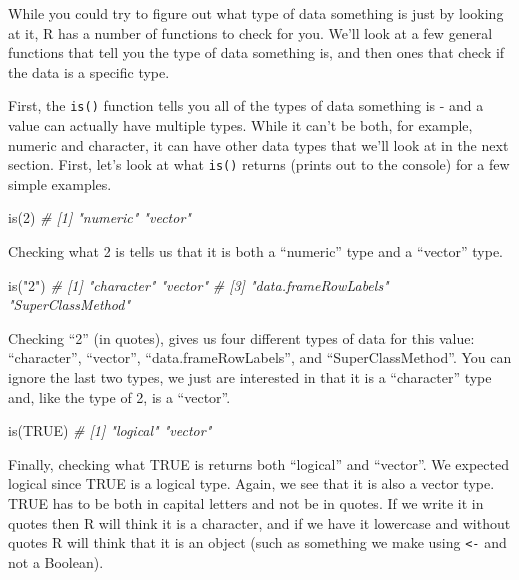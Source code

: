 \documentclass[
]{krantz}
\makeatletter
\newenvironment{Shaded}{\begin{snugshade}}{\end{snugshade}}
\newcommand{\CommentTok}[1]{\textcolor[rgb]{0.37,0.37,0.37}{\textit{#1}}}
\newcommand{\ConstantTok}[1]{\textcolor[rgb]{0,0,0}{#1}}
\newcommand{\DecValTok}[1]{\textcolor[rgb]{0.06,0.06,0.06}{#1}}
\newcommand{\FunctionTok}[1]{\textcolor[rgb]{0,0,0}{#1}}
\newcommand{\NormalTok}[1]{#1}
\newcommand{\StringTok}[1]{\textcolor[rgb]{0.5,0.5,0.5}{#1}}
\newenvironment{kframe}{%
\medskip{}
\setlength{\fboxsep}{.8em}
 \def\at@end@of@kframe{}%
 \ifinner\ifhmode%
  \def\at@end@of@kframe{\end{minipage}}%
  \begin{minipage}{\columnwidth}%
 \fi\fi%
 \def\FrameCommand##1{\hskip\@totalleftmargin \hskip-\fboxsep
 \colorbox{shadecolor}{##1}\hskip-\fboxsep
     \hskip-\linewidth \hskip-\@totalleftmargin \hskip\columnwidth}%
 \MakeFramed {\advance\hsize-\width
   \@totalleftmargin\z@ \linewidth\hsize
   \@setminipage}}%
 {\par\unskip\endMakeFramed%
 \at@end@of@kframe}
\renewenvironment{Shaded}{\begin{kframe}}{\end{kframe}}
\makeatother
\begin{document}
While you could try to figure out what type of data
something is just by looking at it, R has a number of
functions to check for you. We'll look at a few general
functions that tell you the type of data something is, and
then ones that check if the data is a specific type.

First, the \texttt{is()} function tells you all of the types
of data something is - and a value can actually have
multiple types. While it can't be both, for example, numeric
and character, it can have other data types that we'll look
at in the next section. First, let's look at what
\texttt{is()} returns (prints out to the console) for a few
simple examples.

\begin{Shaded}
\begin{Highlighting}[]
\FunctionTok{is}\NormalTok{(}\DecValTok{2}\NormalTok{)}
\CommentTok{\# [1] "numeric" "vector"}
\end{Highlighting}
\end{Shaded}

Checking what 2 is tells us that it is both a ``numeric''
type and a ``vector'' type.

\begin{Shaded}
\begin{Highlighting}[]
\FunctionTok{is}\NormalTok{(}\StringTok{"2"}\NormalTok{)}
\CommentTok{\# [1] "character"           "vector"             }
\CommentTok{\# [3] "data.frameRowLabels" "SuperClassMethod"}
\end{Highlighting}
\end{Shaded}

Checking ``2'' (in quotes), gives us four different types of
data for this value: ``character'', ``vector'',
``data.frameRowLabels'', and ``SuperClassMethod''. You can
ignore the last two types, we just are interested in that it
is a ``character'' type and, like the type of 2, is a
``vector''.

\begin{Shaded}
\begin{Highlighting}[]
\FunctionTok{is}\NormalTok{(}\ConstantTok{TRUE}\NormalTok{)}
\CommentTok{\# [1] "logical" "vector"}
\end{Highlighting}
\end{Shaded}

Finally, checking what TRUE is returns both ``logical'' and
``vector''. We expected logical since TRUE is a logical
type. Again, we see that it is also a vector type. TRUE has
to be both in capital letters and not be in quotes. If we
write it in quotes then R will think it is a character, and
if we have it lowercase and without quotes R will think that
it is an object (such as something we make using
\texttt{\textless{}-} and not a Boolean).
\end{document}
